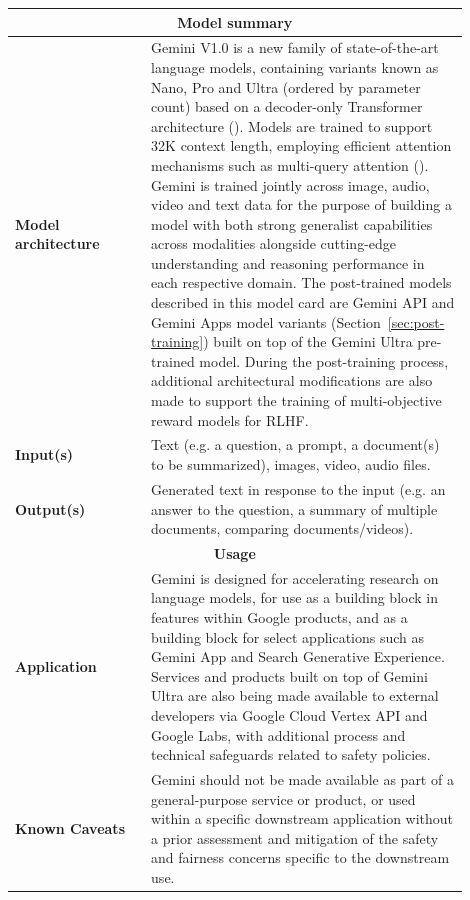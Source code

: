 
\begin{longtable}{p{0.27\linewidth}p{0.63\linewidth}}
\toprule
\multicolumn{2}{c}{\textbf{Model summary}} \\ [0.5ex] \midrule
\textbf{Model architecture} & Gemini V1.0 is a new family of state-of-the-art language models, containing variants known as Nano, Pro and Ultra (ordered by parameter count) based on a decoder-only Transformer architecture (\citealp{transformer_paper}). Models are trained to support 32K context length, employing efficient attention mechanisms such as multi-query attention (\citealp{shazeer2019fast}). Gemini is trained jointly across image, audio, video and text data for the purpose of building a model with both strong generalist capabilities across modalities alongside cutting-edge understanding and reasoning performance in each respective domain. 
\newline
\newline
The post-trained models described in this model card are Gemini API and Gemini Apps model variants (Section~\ref{sec:post-training}) built on top of the Gemini Ultra pre-trained model. During the post-training process, additional architectural modifications are also made to support the training of multi-objective reward models for RLHF. \\
\midrule
\textbf{Input(s)} & Text (e.g. a question, a prompt, a document(s) to be summarized), images, video, audio files. \\
\midrule
\textbf{Output(s)} & Generated text in response to the input (e.g. an answer to the question, a summary of multiple documents, comparing documents/videos). \\
\midrule
\multicolumn{2}{c}{\textbf{Usage}} \\ \midrule
\textbf{Application} & Gemini is designed for accelerating research on language models, for use as a building block in features within Google products, and as a
building block for select applications such as Gemini App and Search Generative Experience.
\newline
\newline
Services and products built on top of Gemini Ultra are also being made available to external developers via Google Cloud Vertex API and Google Labs, with additional process and technical safeguards related to safety policies. \\
\midrule
\textbf{\textbf{Known Caveats}} & Gemini should not be made available as part of a general-purpose service or product, or used within a specific downstream application without a prior assessment and mitigation of the safety and fairness concerns specific to the downstream use. \\

\end{longtable}
